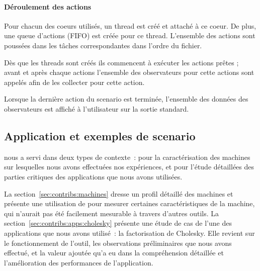 \paragraph{Déroulement des actions}
Pour chacun des coeurs utilisés, un thread est créé et attaché à ce coeur. De plus, une queue d'actions (FIFO) est créée pour ce thread.
L'ensemble des actions sont poussées dans les tâches correspondantes dans l'ordre du fichier.

Dès que les threads sont créés ils commencent à exécuter les actions prêtes ; avant et après chaque actions l'ensemble des observateurs pour cette actions sont appelés afin de les collecter pour cette action.

Lorsque la dernière action du scenario est terminée, l'ensemble des données des observateurs est affiché à l'utilisateur sur la sortie standard.

\subsection{Application et exemples de scenario}

\outil nous a servi dans deux types de contexte~: pour la caractérisation des machines sur lesquelles nous avons effectuées nos expériences, et pour l'étude détaillées des parties critiques des applications que nous avons utilisées.

La section~\ref{sec:contribs:machines} dresse un profil détaillé des machines et présente une utilisation de \outil pour mesurer certaines caractéristiques de la machine, qui n'aurait pas été facilement mesurable à travers d'autres outils.
La section~\ref{sec:contribs:apps:cholesky} présente une étude de cas de l'une des applications que nous avons utilisé~: la factorisation de Cholesky.
Elle revient sur le fonctionnement de l'outil, les observations préliminaires que nous avons effectué, et la valeur ajoutée qu'a eu \outil dans la compréhension détaillée et l'amélioration des performances de l'application.



